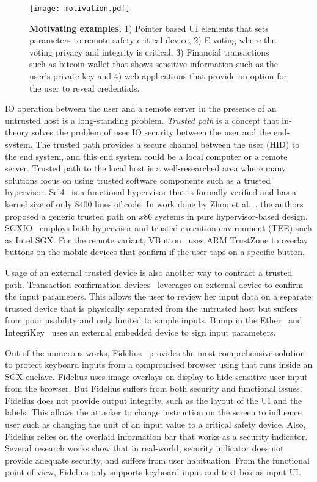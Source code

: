 \begin{figure}[t]
\centering
\texttt{[image: motivation.pdf]}
\caption{\textbf{Motivating examples.} 1) Pointer based UI elements that sets parameters to remote safety-critical device, 2) E-voting where the voting privacy and integrity is critical, 3) Financial transactions such as bitcoin wallet that shows sensitive information such as the user's private key and 4) web applications that provide an option for the user to reveal credentials.}
\spacesave
\label{fig:motivation}
\centering
\end{figure}


IO operation between the user and a remote server in the presence of an untrusted host is a long-standing problem. \emph{Trusted path} is a concept that in-theory solves the problem of user IO security between the user and the end-system. The trusted path provides a secure channel between the user (HID) to the end system, and this end system could be a local computer or a remote server. Trusted path to the local host is a well-researched area where many solutions focus on using trusted software components such as a trusted hypervisor. Sel4~\cite{klein2009sel4} is a functional hypervisor that is formally verified and has a kernel size of only $8400$ lines of code. In work done by Zhou et al.~\cite{zhou2012building}, the authors proposed a generic trusted path on $x86$ systems in pure hypervisor-based design. SGXIO~\cite{weiser2017sgxio} employs both hypervisor and trusted execution environment (TEE) such as Intel SGX. For the remote variant, VButton~\cite{li2018vbutton} uses ARM TrustZone to overlay buttons on the mobile devices that confirm if the user taps on a specific button. 

Usage of an external trusted device is also another way to contract a trusted path. Transaction confirmation devices~\cite{filyanov2011uni,weigold2011secure} leverages on external device to confirm the input parameters. This allows the user to review her input data on a separate trusted device that is physically separated from the untrusted host but suffers from poor usability and only limited to simple inputs. Bump in the Ether~\cite{McCPerRei2006} and IntegriKey~\cite{IntegriKey} uses an external embedded device to sign input parameters.

 Out of the numerous works, Fidelius~\cite{Fidelius} provides the most comprehensive solution to protect keyboard inputs from a compromised browser using \js that runs inside an SGX enclave. Fidelius uses image overlays on display to hide sensitive user input from the browser. But Fidelius suffers from both security and functional issues. Fidelius does not provide output integrity, such as the layout of the UI and the labels. This allows the attacker to change instruction on the screen to influence user such as changing the unit of an input value to a critical safety device. Also, Fidelius relies on the overlaid information bar that works as a security indicator. Several research works show that in real-world, security indicator does not provide adequate security, and suffers from user habituation. From the functional point of view, Fidelius only supports keyboard input and text box as input UI.
 
